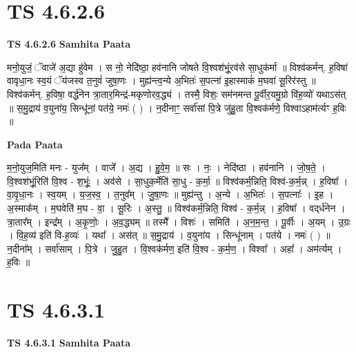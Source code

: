 \documentclass[17pt]{extarticle}
\begin{document}

\section{ TS 4.6.2.6 }

\textbf{TS 4.6.2.6 } \newline
\textbf{Samhita Paata} \newline

मनो॒युजं॒ ॅवाजे॑ अ॒द्या हु॑वेम । स नो॒ नेदि॑ष्ठा॒ हव॑नानि जोषते वि॒श्वश॑भूं॒रव॑से सा॒धुक॑र्मा ॥ विश्व॑कर्मन्. ह॒विषा॑ वावृधा॒नः स्व॒यं ॅय॑जस्व त॒नुवं॑ जुषा॒णः । मुह्य॑न्त्व॒न्ये अ॒भितः॑ स॒पत्ना॑ इ॒हास्माकं॑ म॒घवा॑ सू॒रिर॑स्तु ॥ विश्व॑कर्मन्. ह॒विषा॒ वर्द्ध॑नेन त्रा॒तार॒मिन्द्र॑-मकृणोरव॒द्ध्यं । तस्मै॒ विशः॒ सम॑नमन्त पू॒र्वीर॒यमु॒ग्रो वि॑ह॒व्यो॑ यथाऽस॑त् ॥ स॒मु॒द्राय॑ व॒युना॑य॒ सिन्धू॑नां॒ पत॑ये॒ नमः॑ ( ) । न॒दीनाꣳ॒॒ सर्वा॑सां पि॒त्रे जु॑हु॒ता वि॒श्वक॑र्मणे॒ विश्वाऽहाम॑र्त्यꣳ ह॒विः ॥ \newline

\textbf{Pada Paata} \newline

म॒नो॒युज॒मिति॑ मनः - युज᳚म् । वाजे᳚ । अ॒द्य । हु॒वे॒म॒ ॥ सः । नः॒ । नेदि॑ष्ठा । हव॑नानि । जो॒ष॒ते॒ । वि॒श्वश॑भूं॒रिति॑ वि॒श्व - श॒भूंः॒ । अव॑से । सा॒धुक॒र्मेति॑ सा॒धु - क॒र्मा॒ ॥ विश्व॑कर्म॒न्निति॒ विश्व॑-क॒र्म॒न्न् । ह॒विषा᳚ । वा॒वृ॒धा॒नः । स्व॒यम् । य॒ज॒स्व॒ । त॒नुव᳚म् । जु॒षा॒णः ॥ मुह्य॑न्तु । अ॒न्ये । अ॒भितः॑ । स॒पत्नाः᳚ । इ॒ह । अ॒स्माक᳚म् । म॒घवेति॑ म॒घ - वा॒ । सू॒रिः । अ॒स्तु॒ ॥ विश्व॑कर्म॒न्निति॒ विश्व॑ - क॒र्म॒न्न् । ह॒विषा᳚ । वद्‌र्ध॑नेन । त्रा॒तार᳚म् । इन्द्र᳚म् । अ॒कृ॒णोः॒ । अ॒व॒द्ध्यम् ॥ तस्मै᳚ । विशः॑ । समिति॑ । अ॒न॒म॒न्त॒ । पू॒र्वीः । अ॒यम् । उ॒ग्रः । वि॒ह॒व्य॑ इति॑ वि-ह॒व्यः॑ । यथा᳚ । अस॑त् ॥ स॒मु॒द्राय॑ । व॒युना॑य । सिन्धू॑नाम् । पत॑ये । नमः॑ ( ) ॥ न॒दीना᳚म् । सर्वा॑साम् । पि॒त्रे । जु॒हु॒त । वि॒श्वक॑र्मण॒ इति॑ वि॒श्व - क॒र्म॒ण॒ । विश्वा᳚ । अहा᳚ । अम॑र्त्यम् । ह॒विः ॥  \newline





\section{ TS 4.6.3.1 }

\textbf{TS 4.6.3.1 } \newline
\textbf{Samhita Paata} \newline
\end{document}
